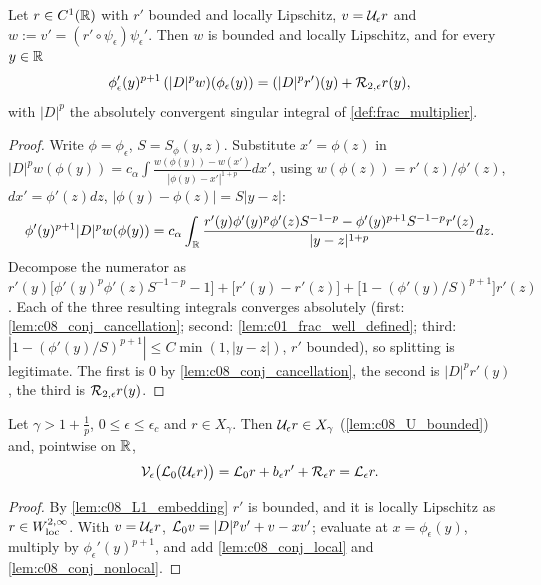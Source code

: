 \begin{lemma}
  \label{lem:c08_conj_nonlocal}
  Let $r\in C^1(\mathbb{R})$ with $r'$ bounded and locally Lipschitz, $v=\mathcal{U}_\epsilon r$ and $w:=v'=(r'\circ\psi_\epsilon)\psi_\epsilon'$.
  Then $w$ is bounded and locally Lipschitz, and for every $y\in\mathbb{R}$
  \[
    \phi_\epsilon'(y)^{p+1}\,(|D|^pw)(\phi_\epsilon(y))=(|D|^pr')(y)+\mathcal{R}_{2,\epsilon}r(y),
  \]
  with $|D|^p$ the absolutely convergent singular integral of \cref{def:frac_multiplier}.
\end{lemma}
\begin{proof}
  Write $\phi=\phi_\epsilon$, $S=S_\phi(y,z)$. Substitute $x'=\phi(z)$ in
  $|D|^pw(\phi(y))=c_\alpha\int\frac{w(\phi(y))-w(x')}{|\phi(y)-x'|^{1+p}}dx'$, using $w(\phi(z))=r'(z)/\phi'(z)$,
  $dx'=\phi'(z)dz$, $|\phi(y)-\phi(z)|=S|y-z|$:
  \[
    \phi'(y)^{p+1}|D|^pw(\phi(y))=c_\alpha\int_{\mathbb{R}}\frac{r'(y)\phi'(y)^p\phi'(z)S^{-1-p}-\phi'(y)^{p+1}S^{-1-p}r'(z)}{|y-z|^{1+p}}dz .
  \]
  Decompose the numerator as
  $r'(y)\bigl[\phi'(y)^p\phi'(z)S^{-1-p}-1\bigr]+\bigl[r'(y)-r'(z)\bigr]+\bigl[1-(\phi'(y)/S)^{p+1}\bigr]r'(z)$.
  Each of the three resulting integrals converges absolutely (first: \cref{lem:c08_conj_cancellation};
  second: \cref{lem:c01_frac_well_defined}; third: $|1-(\phi'(y)/S)^{p+1}|\le C\min(1,|y-z|)$, $r'$ bounded), so
  splitting is legitimate. The first is $0$ by \cref{lem:c08_conj_cancellation}, the second is
  $|D|^pr'(y)$, the third is $\mathcal{R}_{2,\epsilon}r(y)$.
\end{proof}

\begin{lemma}
  \label{lem:c08_conjugation_identity}
  Let $\gamma>1+\frac1p$, $0\le\epsilon\le\epsilon_c$ and $r\in X_\gamma$. Then $\mathcal{U}_\epsilon r\in X_\gamma$ (\cref{lem:c08_U_bounded}) and,
  pointwise on $\mathbb{R}$,
  \begin{equation}\label{eqn:linear_conjugation}
    \mathcal{V}_\epsilon\bigl(\mathcal{L}_0(\mathcal{U}_\epsilon r)\bigr)=\mathcal{L}_0r+b_\epsilon r'+\mathcal{R}_\epsilon r=\mathcal{L}_\epsilon r .
  \end{equation}
\end{lemma}
\begin{proof}
  By \cref{lem:c08_L1_embedding} $r'$ is bounded, and it is locally Lipschitz as $r\in W^{2,\infty}_{\rm loc}$. With
  $v=\mathcal{U}_\epsilon r$, $\mathcal{L}_0v=|D|^pv'+v-xv'$; evaluate at $x=\phi_\epsilon(y)$, multiply by $\phi_\epsilon'(y)^{p+1}$, and add
  \cref{lem:c08_conj_local} and \cref{lem:c08_conj_nonlocal}.
\end{proof}

